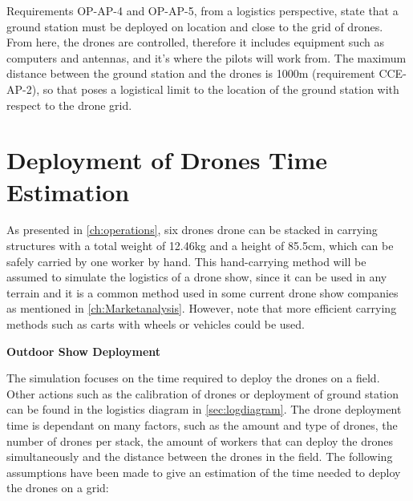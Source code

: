 Requirements OP-AP-4 and OP-AP-5, from a logistics perspective,  state that a ground station must be deployed on location and close to the grid of drones. From here, the drones are controlled, therefore it includes equipment such as computers and antennas, and it's where the pilots will work from. The maximum distance between the ground station and the drones is 1000m (requirement CCE-AP-2), so that poses a logistical limit to the location of the ground station with respect to the drone grid.


\section{Deployment of Drones Time Estimation} \label{sec:logisticssim}

As presented in \autoref{ch:operations}, six drones drone can be stacked in carrying structures with a total weight of 12.46kg and a height of 85.5cm, which can be safely carried by one worker by hand. This hand-carrying method will be assumed to simulate the logistics of a drone show, since it can be used in any terrain and it is a common method used in some current drone show companies as mentioned in \autoref{ch:Marketanalysis}. However, note that more efficient carrying methods such as carts with wheels or vehicles could be used.

\textbf{Outdoor Show Deployment}

The simulation focuses on the time required to deploy the drones on a field. Other actions such as the calibration of drones or deployment of ground station can be found in the logistics diagram in \autoref{sec:logdiagram}. The drone deployment time is dependant on many factors, such as the amount and type of drones, the number of drones per stack, the amount of workers that can deploy the drones simultaneously and the distance between the drones in the field. The following assumptions have been made to give an estimation of the time needed to deploy the drones on a grid:

